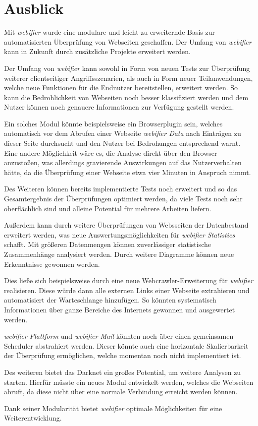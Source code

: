 \chapter{Ausblick}

Mit \textit{webifier} wurde eine modulare und leicht zu erweiternde Basis zur automatisierten Überprüfung
von Webseiten geschaffen. Der Umfang von \textit{webifier} kann in Zukunft durch zusätzliche Projekte
erweitert werden.

Der Umfang von \textit{webifier} kann sowohl in Form von neuen Tests zur Überprüfung weiterer clientseitiger
Angriffsszenarien, als auch in Form neuer Teilanwendungen, welche neue Funktionen für
die Endnutzer bereitstellen, erweitert werden. So kann die Bedrohlichkeit von Webseiten noch besser
klassifiziert werden und dem Nutzer können noch genauere Informationen zur Verfügung gestellt
werden.

Ein solches Modul könnte beispielsweise ein Browserplugin sein, welches automatisch vor dem Abrufen
einer Webseite \textit{webifier Data} nach Einträgen zu dieser Seite durchsucht und den Nutzer bei
Bedrohungen entsprechend warnt. Eine andere Möglichkeit wäre es, die Analyse direkt über den Browser
anzustoßen, was allerdings gravierende Auswirkungen auf das Nutzerverhalten hätte, da die
Überprüfung einer Webseite etwa vier Minuten in Anspruch nimmt.

Des Weiteren können bereits implementierte Tests noch erweitert und so das Gesamtergebnis der
Überprüfungen optimiert werden, da viele Tests noch sehr oberflächlich sind und alleine Potential
für mehrere Arbeiten liefern.

Außerdem kann durch weitere Überprüfungen von Websseiten der Datenbestand erweitert werden, was neue
Auswertungsmöglichkeiten für \textit{webifier Statistics} schafft. Mit größeren Datenmengen können
zuverlässiger statistische Zusammenhänge analysiert werden. Durch weitere Diagramme können neue
Erkenntnisse gewonnen werden.

Dies ließe sich beispielsweise durch eine neue Webcrawler-Erweiterung für \textit{webifier} realisieren. Diese würde dann alle externen Links einer Webseite extrahieren und automatisiert der Warteschlange hinzufügen. So könnten systematisch Informationen über ganze Bereiche des Internets gewonnen und ausgewertet werden.

\textit{webifier Plattform} und \textit{webifier Mail} könnten noch über einen gemeinsamen Scheduler abstrahiert
werden. Dieser könnte auch eine horizontale Skalierbarkeit der Überprüfung ermöglichen, welche
momentan noch nicht implementiert ist.

Des weiteren bietet das Darknet ein großes Potential, um weitere Analysen zu starten. Hierfür
müsste ein neues Modul entwickelt werden, welches die Webseiten abruft, da diese nicht über eine
normale Verbindung erreicht werden können.

Dank seiner Modularität bietet \textit{webifier} optimale Möglichkeiten für eine Weiterentwicklung.